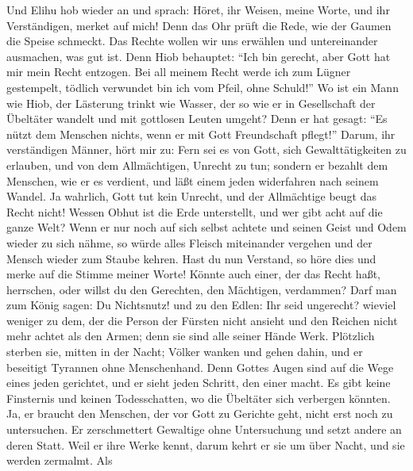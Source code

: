  Und Elihu hob wieder an und sprach:  Höret,
ihr Weisen, meine Worte, und ihr Verständigen, merket auf mich!
 Denn das Ohr prüft die Rede, wie der Gaumen die Speise
schmeckt.  Das Rechte wollen wir uns erwählen und
untereinander ausmachen, was gut ist.  Denn Hiob
behauptet: ``Ich bin gerecht, aber Gott hat mir mein Recht entzogen.
 Bei all meinem Recht werde ich zum Lügner gestempelt,
tödlich verwundet bin ich vom Pfeil, ohne Schuld!''  Wo
ist ein Mann wie Hiob, der Lästerung trinkt wie Wasser, 
der so wie er in Gesellschaft der Übeltäter wandelt und mit gottlosen
Leuten umgeht?  Denn er hat gesagt: ``Es nützt dem
Menschen nichts, wenn er mit Gott Freundschaft pflegt!'' 
Darum, ihr verständigen Männer, hört mir zu: Fern sei es von Gott, sich
Gewalttätigkeiten zu erlauben, und von dem Allmächtigen, Unrecht zu tun;
 sondern er bezahlt dem Menschen, wie er es verdient, und
läßt einem jeden widerfahren nach seinem Wandel.  Ja
wahrlich, Gott tut kein Unrecht, und der Allmächtige beugt das Recht
nicht!  Wessen Obhut ist die Erde unterstellt, und wer
gibt acht auf die ganze Welt?  Wenn er nur noch auf sich
selbst achtete und seinen Geist und Odem wieder zu sich nähme,
 so würde alles Fleisch miteinander vergehen und der
Mensch wieder zum Staube kehren.  Hast du nun Verstand,
so höre dies und merke auf die Stimme meiner Worte! 
Könnte auch einer, der das Recht haßt, herrschen, oder willst du den
Gerechten, den Mächtigen, verdammen?  Darf man zum König
sagen: Du Nichtsnutz! und zu den Edlen: Ihr seid ungerecht?
 wieviel weniger zu dem, der die Person der Fürsten nicht
ansieht und den Reichen nicht mehr achtet als den Armen; denn sie sind
alle seiner Hände Werk.  Plötzlich sterben sie, mitten in
der Nacht; Völker wanken und gehen dahin, und er beseitigt Tyrannen ohne
Menschenhand.  Denn Gottes Augen sind auf die Wege eines
jeden gerichtet, und er sieht jeden Schritt, den einer macht.
 Es gibt keine Finsternis und keinen Todesschatten, wo
die Übeltäter sich verbergen könnten.  Ja, er braucht den
Menschen, der vor Gott zu Gerichte geht, nicht erst noch zu untersuchen.
 Er zerschmettert Gewaltige ohne Untersuchung und setzt
andere an deren Statt.  Weil er ihre Werke kennt, darum
kehrt er sie um über Nacht, und sie werden zermalmt.  Als
